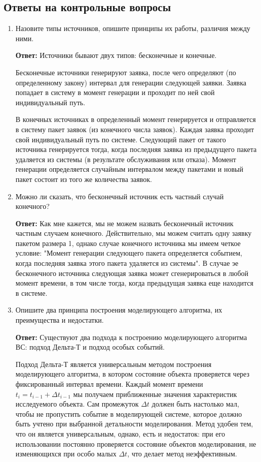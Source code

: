 \documentclass[a4paper, 14pt]{article}
\begin{document}
\newpage

\subsection{Ответы на контрольные вопросы}

\begin{enumerate}
	\item Назовите типы источников, опишите принципы их работы, различия между ними.

	      \textbf{Ответ:} Источники бывают двух типов: бесконечные и конечные.

	      Бесконечные источники генерируют заявка, после чего определяют (по определенному закону) интервал для генерации следующей заявки. Заявка попадает в систему в момент генерации и проходит по ней свой индивидуальный путь.

	      В конечных источниках в определенный момент генерируется и отправляется в систему пакет заявок (из конечного числа заявок). Каждая заявка проходит свой индивидуальный путь по системе. Следующий пакет от такого источника генерируется тогда, когда последняя заявка из предыдущего пакета удаляется из системы (в результате обслуживания или отказа). Момент генерации определяется случайным интервалом между пакетами и новый пакет состоит из того же количества заявок.
	\item Можно ли сказать, что бесконечный источник есть частный случай конечного?

	      \textbf{Ответ:} Как мне кажется, мы не можем назвать бесконечный источник частным случаем конечного. Действительно, мы можем считать одну заявку пакетом размера 1, однако случае конечного источника мы имеем четкое условие: "Момент генерации следующего пакета определяется событием, когда последняя заявка этого пакета удаляется из системы". В случае эе бесконечного источника следующая заявка может сгенерироваться в любой момент времени, в том числе тогда, когда предыдущая заявка еще находится в системе.
	\item Опишите два принципа построения моделирующего алгоритма, их преимущества и недостатки.

	      \textbf{Ответ:} Существуют два подхода к построению моделирующего алгоритма ВС: подход Дельта-Т и подход особых событий.

	      Подход Дельта-Т является универсальным методом построения моделирующего алгоритма, в котором состояние объекта проверяется через фиксированный интервал времени. Каждый момент времени $t_i=t_{i-1}+\Delta{t_{i-1}}$ мы получаем приближенные значения характеристик исследуемого объекта. Сам промежуток $\Delta{t}$ должен быть настолько мал, чтобы не пропустить событие в моделирующей системе, которое должно быть учтено при выбранной детальности моделирования. Метод удобен тем, что он является универсальным, однако, есть и недостаток: при его использовании постоянно проверяется состояние объектов моделирования, не изменяющихся при особо малых $\Delta{t}$, что делает метод неэффективным.


\end{enumerate}
\end{document}
